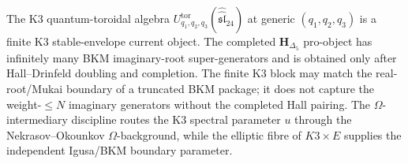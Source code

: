 \begin{remark}
\label{rem:k3qt-finite-vs-prolimit}
The K3 quantum-toroidal algebra
$U^{\mathrm{tor}}_{q_1,q_2,q_3}(\widehat{\widehat{\mathfrak{sl}}}_{24})$
at generic $(q_1,q_2,q_3)$ is a finite K3 stable-envelope current
object. The completed $\mathbf H_{\Delta_5}$ pro-object has infinitely
many BKM imaginary-root super-generators and is obtained only after
Hall--Drinfeld doubling and completion. The finite K3 block may match
the real-root/Mukai boundary of a truncated BKM package; it does not
capture the weight-$\leq N$ imaginary generators without the completed
Hall pairing. The $\Omega$-intermediary discipline routes the K3
spectral parameter $u$ through the Nekrasov--Okounkov
$\Omega$-background, while the elliptic fibre of $K3\times E$ supplies
the independent Igusa/BKM boundary parameter.
\end{remark}

